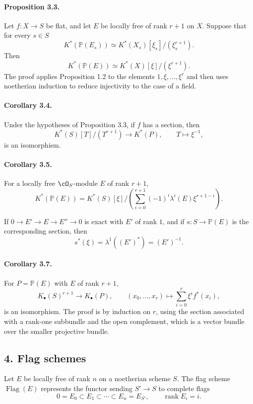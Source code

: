 \documentclass[11pt]{article}
\theoremstyle{plain}
\theoremstyle{definition}
\theoremstyle{remark}
\newcommand{\bP}{\mathbb P}
\DeclareMathOperator{\rank}{rank}
\newcommand{\longto}{\longrightarrow}
\providecommand{\Drap}{\operatorname{Flag}}
\begin{document}
\paragraph{Proposition 3.3.}
Let $f:X\to S$ be flat, and let $E$ be locally free of rank $r+1$ on $X$. Suppose that for every $s\in S$
\[
K^*(\bP(E_s))\simeq K^*(X_s)[\xi_s]/(\xi_s^{r+1}).
\]
Then
\[
K^*(\bP(E))\simeq K^*(X)[\xi]/(\xi^{r+1}).
\]
The proof applies Proposition 1.2 to the elements $1,\xi,\ldots,\xi^r$ and then uses noetherian induction to reduce injectivity to the case of a field.

\paragraph{Corollary 3.4.}
Under the hypotheses of Proposition 3.3, if $f$ has a section, then
\[
K^*(S)[T]/(T^{r+1})\longto K^*(P),\qquad T\longmapsto\xi^{-1},
\]
is an isomorphism.

\paragraph{Corollary 3.5.}
For a locally free $\cO_S$-module $E$ of rank $r+1$,
\[
K^*(\bP(E))=
K^*(S)[\xi]\Big/\left(\sum_{i=0}^{r+1}(-1)^i\lambda^i(E)\xi^{r+1-i}\right).
\]

If $0\to E'\to E\to E''\to0$ is exact with $E'$ of rank $1$, and if $s:S\to\bP(E)$ is the corresponding section, then
\[
s^*(\xi)=\lambda^1((E')^*)=(E')^{-1}.
\]

\paragraph{Corollary 3.7.}
For $P=\bP(E)$ with $E$ of rank $r+1$,
\[
K_\bullet(S)^{r+1}\longto K_\bullet(P),\qquad
(x_0,\ldots,x_r)\longmapsto \sum_{i=0}^r \xi^i f^*(x_i),
\]
is an isomorphism. The proof is by induction on $r$, using the section associated with a rank-one subbundle and the open complement, which is a vector bundle over the smaller projective bundle.

\subsection*{4. Flag schemes}

Let $E$ be locally free of rank $n$ on a noetherian scheme $S$. The flag scheme $\Drap(E)$ represents the functor sending $S'\to S$ to complete flags
\[
0=E_0\subset E_1\subset\cdots\subset E_n=E_{S'},\qquad \rank E_i=i.
\]
\end{document}
